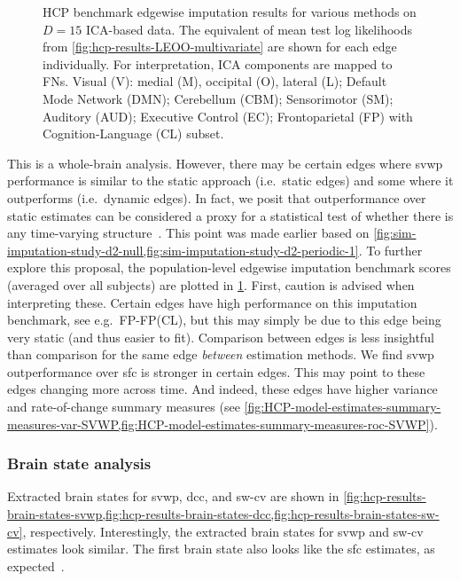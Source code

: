 \begin{figure}[t]
  \caption{
    HCP benchmark edgewise imputation results for various methods on $D = 15$ ICA-based data.
    The equivalent of mean test log likelihoods from \cref{fig:hcp-results-LEOO-multivariate} are shown for each edge individually.
    For interpretation, ICA components are mapped to FNs.
    Visual (V): medial (M), occipital (O), lateral (L); Default Mode Network (DMN); Cerebellum (CBM); Sensorimotor (SM); Auditory (AUD); Executive Control (EC); Frontoparietal (FP) with Cognition-Language (CL) subset.
  }\label{fig:hcp-results-edgewise-imputation-benchmark}
\end{figure}


This is a whole-brain analysis.
However, there may be certain edges where \gls{svwp} performance is similar to the static approach (i.e.~static edges) and some where it outperforms (i.e.~dynamic edges).
In fact, we posit that outperformance over static estimates can be considered a proxy for a statistical test of whether there is any time-varying structure~\parencite[see also][]{Zalesky2014, Hindriks2016}.
This point was made earlier based on \cref{fig:sim-imputation-study-d2-null,fig:sim-imputation-study-d2-periodic-1}.
To further explore this proposal, the population-level edgewise imputation benchmark scores (averaged over all subjects) are plotted in \cref{fig:hcp-results-edgewise-imputation-benchmark}.
First, caution is advised when interpreting these.
Certain edges have high performance on this imputation benchmark, see e.g.~FP-FP(CL), but this may simply be due to this edge being very static (and thus easier to fit).
Comparison between edges is less insightful than comparison for the same edge \emph{between} estimation methods.
%
We find \gls{svwp} outperformance over \gls{sfc} is stronger in certain edges.
This may point to these edges changing more across time.
And indeed, these edges have higher variance and rate-of-change summary measures (see \cref{fig:HCP-model-estimates-summary-measures-var-SVWP,fig:HCP-model-estimates-summary-measures-roc-SVWP}).

\subsubsection{Brain state analysis}

Extracted brain states for \gls{svwp}, \gls{dcc}, and \gls{sw-cv} are shown in \cref{fig:hcp-results-brain-states-svwp,fig:hcp-results-brain-states-dcc,fig:hcp-results-brain-states-sw-cv}, respectively.
Interestingly, the extracted brain states for \gls{svwp} and \gls{sw-cv} estimates look similar.
The first brain state also looks like the \gls{sfc} estimates, as expected~\parencite{Allen2014}.

